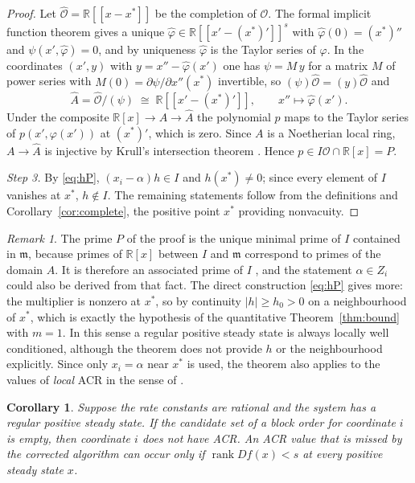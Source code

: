 \documentclass[11pt,a4paper]{article}
\theoremstyle{plain}
\newtheorem{corollary}[theorem]{Corollary}
\theoremstyle{definition}
\theoremstyle{remark}
\newtheorem{remark}[theorem]{Remark}
\newcommand{\R}{\mathbb{R}}
\newcommand{\rank}{\operatorname{rank}}
\begin{document}
\begin{proof}
Let $\widehat{\mathcal O}=\R[[x-x^*]]$ be the completion of $\mathcal O$. The formal implicit function theorem gives a unique $\widehat\varphi\in\R[[x'-(x^*)']]^s$ with $\widehat\varphi(0)=(x^*)''$ and $\psi(x',\widehat\varphi)=0$, and by uniqueness $\widehat\varphi$ is the Taylor series of $\varphi$. In the coordinates $(x',y)$ with $y=x''-\widehat\varphi(x')$ one has $\psi=M\,y$ for a matrix $M$ of power series with $M(0)=\partial\psi/\partial x''(x^*)$ invertible, so $(\psi)\widehat{\mathcal O}=(y)\widehat{\mathcal O}$ and
\[
  \widehat A=\widehat{\mathcal O}/(\psi)\;\cong\;\R[[x'-(x^*)']],\qquad x''\longmapsto\widehat\varphi(x') .
\]
Under the composite $\R[x]\to A\to\widehat A$ the polynomial $p$ maps to the Taylor series of $p(x',\varphi(x'))$ at $(x^*)'$, which is zero. Since $A$ is a Noetherian local ring, $A\to\widehat A$ is injective by Krull's intersection theorem \cite[Theorem~8.10]{matsumura}. Hence $p\in I\mathcal O\cap\R[x]=P$.

\emph{Step 3.} By \eqref{eq:hP}, $(x_i-\alpha)h\in I$ and $h(x^*)\neq0$; since every element of $I$ vanishes at $x^*$, $h\notin I$. The remaining statements follow from the definitions and Corollary~\ref{cor:complete}, the positive point $x^*$ providing nonvacuity.
\end{proof}

\begin{remark}\label{rem:minimalprime}
The prime $P$ of the proof is the unique minimal prime of $I$ contained in $\mathfrak m$, because primes of $\R[x]$ between $I$ and $\mathfrak m$ correspond to primes of the domain $A$. It is therefore an associated prime of $I$ \cite[Theorem~6.5]{matsumura}, and the statement $\alpha\in Z_i$ could also be derived from that fact. The direct construction \eqref{eq:hP} gives more: the multiplier is nonzero at $x^*$, so by continuity $|h|\ge h_0>0$ on a neighbourhood of $x^*$, which is exactly the hypothesis of the quantitative Theorem~\ref{thm:bound} with $m=1$. In this sense a regular positive steady state is always locally well conditioned, although the theorem does not provide $h$ or the neighbourhood explicitly. Since only $x_i=\alpha$ near $x^*$ is used, the theorem also applies to the values of \emph{local} ACR in the sense of \cite{localglobal}.
\end{remark}

\begin{corollary}\label{cor:missed}
Suppose the rate constants are rational and the system has a regular positive steady state. If the candidate set of a block order for coordinate $i$ is empty, then coordinate $i$ does not have ACR. An ACR value that is missed by the corrected algorithm can occur only if $\rank Df(x)<s$ at every positive steady state $x$.
\end{corollary}
\end{document}
